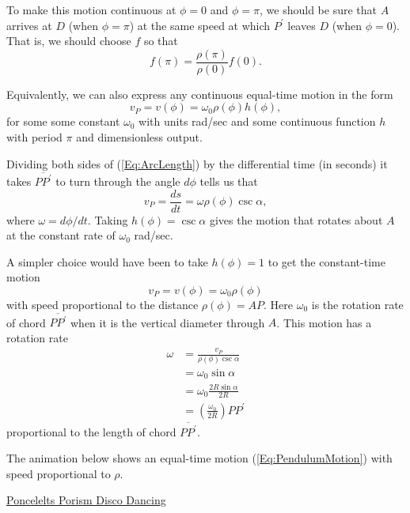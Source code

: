 \documentclass{ximera}
\begin{document}
To make this motion continuous at $\phi=0$ and $\phi= \pi$, we should be sure that $A$ arrives at $D$ (when $\phi=\pi$) at the same speed at which $P^\prime$ leaves $D$ (when $\phi = 0$). That is, we should choose $f$ so that 
\[
   f(\pi) =  \frac{\rho(\pi)}{\rho(0)} f(0) .
\]


Equivalently, we can also express any continuous equal-time motion in the form
\[
      v_P = v(\phi) = \omega_0 \rho (\phi) h(\phi) ,
\]
for some some constant $\omega_0$ with units rad/sec and some continuous function $h$ with period $\pi$ and dimensionless output.

Dividing both sides of (\ref{Eq:ArcLength}) by the differential time (in seconds) it takes $\overline{PP^\prime}$ to turn through the angle $d\phi$ tells us that 
\begin{equation}
    v_P = \frac{ds}{dt} = \omega \rho (\phi) \csc \alpha ,  \label{Eq:ConstantRate}
\end{equation}
where $\omega  = d\phi/dt$. Taking $h(\phi) = \csc \alpha$ gives the motion that rotates about $A$ at the constant rate of $\omega_0$ rad/sec.

A simpler choice would have been to take $h(\phi)=1$ to get the constant-time motion                  %
\begin{equation}
   v_P =   v(\phi) = \omega_0 \rho(\phi) \label{Eq:PendulumMotion} 
\end{equation}
with speed proportional to the distance $\rho(\phi) = AP$. Here $\omega_0$ is the rotation rate of chord $\overline{PP^\prime}$ when it is the vertical diameter through $A$. This motion has a rotation rate %
\begin{align*}
     \omega &= \frac{v_P}{\rho (\phi) \csc \alpha} \\
                 &= \omega_0 \sin\alpha  \\
                  & = \omega_0 \frac{2R \sin\alpha}{2R}  \\
                  &=  \left( \frac{\omega_0}{2R}\right) PP^\prime 
\end{align*}
proportional to the length of chord $\overline{PP^\prime}$.

\begin{exploration}
The animation below shows an equal-time motion (\ref{Eq:PendulumMotion}) with speed proportional to $\rho$.
\begin{onlineOnly}
    \begin{center}
\end{center}
\end{onlineOnly}

\href{https://www.desmos.com/calculator/g2o1szpkh5}{Poncelelts Porism Disco Dancing}
\end{exploration}
\end{document}
